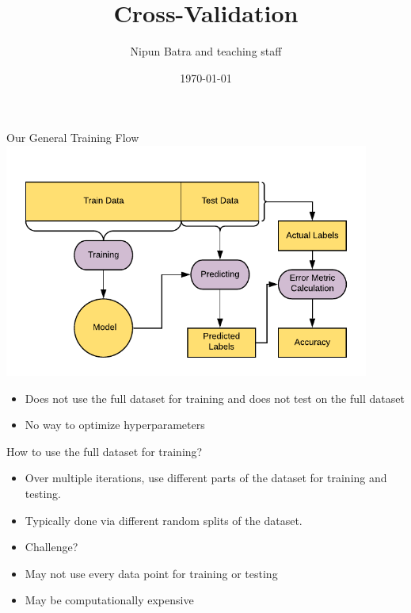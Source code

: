 \documentclass[usenames,dvipsnames]{beamer}
\title{Cross-Validation}
\date{\today}
\author{Nipun Batra and teaching staff}
\institute{IIT Gandhinagar}
\begin{document}
	\maketitle
	
	


\begin{frame}{Our General Training Flow}
\includegraphics[width = 0.9\textwidth]{../assets/cross-validation/diagrams/general-workflow}
\begin{itemize}
	\item \pause Does not use the full dataset for training and does not test on the full dataset
	\item \pause No way to optimize hyperparameters
\end{itemize}
\end{frame}

\begin{frame}{How to use the full dataset for training?}
\begin{itemize}
	\item \pause Over multiple iterations, use different parts of the dataset for training and testing.
	\item \pause Typically done via different random splits of the dataset.
	\item \pause Challenge?
	\item \pause May not use every data point for training or testing
	\item \pause May be computationally expensive

\end{itemize}
	
\end{frame}
\end{document}
